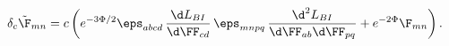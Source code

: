 \begin{equation}
\delta_c {\tilde \F}_{mn} = c\left(
  e^{-3\Phi/2}\eps_{abcd}\,\frac{\d L_{BI}}{\d\FF_{cd}}\,
        \eps_{mnpq}\,\frac{\d^2L_{BI}}{\d\FF_{ab}\d\FF_{pq}}
  + e^{-2\Phi}\F_{mn}\right).
\end{equation}

